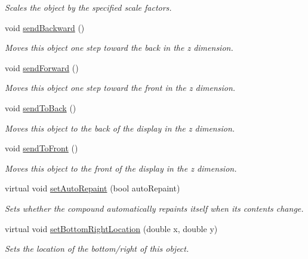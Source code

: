 \begin{DoxyCompactItemize}
\begin{DoxyCompactList}\small\item\em Scales the object by the specified scale factors. \end{DoxyCompactList}\item 
void \mbox{\hyperlink{classGObject_ab6747f40313c531c2db32edb5b63b9b7}{send\+Backward}} ()
\begin{DoxyCompactList}\small\item\em Moves this object one step toward the back in the {\itshape z} dimension. \end{DoxyCompactList}\item 
void \mbox{\hyperlink{classGObject_a710b3e449c9facba7847c91ab170d281}{send\+Forward}} ()
\begin{DoxyCompactList}\small\item\em Moves this object one step toward the front in the {\itshape z} dimension. \end{DoxyCompactList}\item 
void \mbox{\hyperlink{classGObject_a0f7f1efbb7fd46dde2867c4ad0330896}{send\+To\+Back}} ()
\begin{DoxyCompactList}\small\item\em Moves this object to the back of the display in the {\itshape z} dimension. \end{DoxyCompactList}\item 
void \mbox{\hyperlink{classGObject_aee33d68488e46827ef55fac07f40a9b2}{send\+To\+Front}} ()
\begin{DoxyCompactList}\small\item\em Moves this object to the front of the display in the {\itshape z} dimension. \end{DoxyCompactList}\item 
virtual void \mbox{\hyperlink{classGCompound_adf10848319457bd6df4c657bf8872bee}{set\+Auto\+Repaint}} (bool auto\+Repaint)
\begin{DoxyCompactList}\small\item\em Sets whether the compound automatically repaints itself when its contents change. \end{DoxyCompactList}\item 
virtual void \mbox{\hyperlink{classGObject_a71ff7b16b8f1bdc4a1ce9f30cf8b87d8}{set\+Bottom\+Right\+Location}} (double x, double y)
\begin{DoxyCompactList}\small\item\em Sets the location of the bottom/right of this object. \end{DoxyCompactList}\item 

\end{DoxyCompactItemize}
